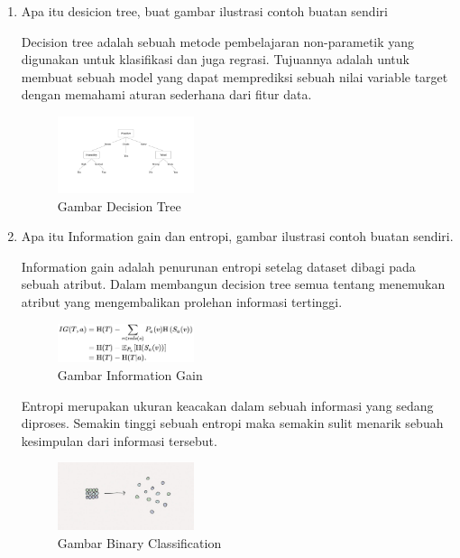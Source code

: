\begin{enumerate}
\item Apa itu desicion tree, buat gambar ilustrasi contoh buatan sendiri

Decision tree adalah sebuah metode pembelajaran non-parametik yang digunakan untuk klasifikasi dan juga regrasi. Tujuannya adalah untuk membuat sebuah model yang dapat memprediksi sebuah nilai variable target dengan memahami aturan sederhana dari fitur data.

\begin{figure}[H]
	\includegraphics[width=4cm]{figures/1174062/2/Teori/no6.png}
	\centering
	\caption{Gambar Decision Tree }
\end{figure}

\item Apa itu Information gain dan entropi, gambar ilustrasi contoh buatan sendiri.

Information gain adalah penurunan entropi setelag dataset dibagi pada sebuah atribut. Dalam membangun decision tree semua tentang menemukan atribut yang mengembalikan prolehan informasi tertinggi.\\

\begin{figure}[H]
	\includegraphics[width=4cm]{figures/1174062/2/Teori/no7.png}
	\centering
	\caption{Gambar Information Gain }
\end{figure}

Entropi merupakan ukuran keacakan dalam sebuah informasi yang sedang diproses. Semakin tinggi sebuah entropi  maka semakin sulit menarik sebuah kesimpulan dari informasi tersebut.

\begin{figure}[H]
	\includegraphics[width=4cm]{figures/1174062/2/Teori/Entropy.png}
	\centering
	\caption{Gambar Binary Classification }
\end{figure}
\end{enumerate}

